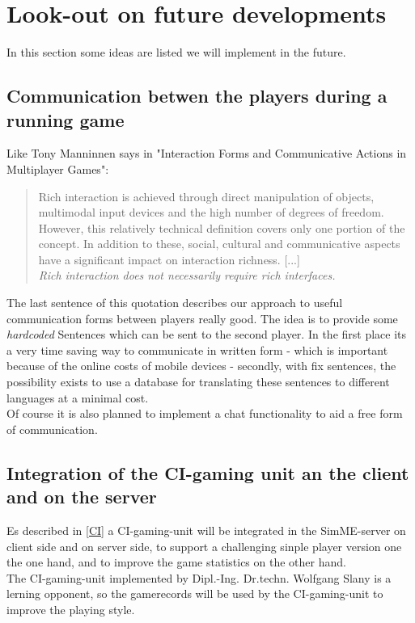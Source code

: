 \section{Look-out on future developments}
In this section some ideas are listed we will implement in the future.

\subsection{Communication betwen the players during a running game}
Like Tony Manninnen says in "Interaction Forms and Communicative Actions in
Multiplayer Games"\cite{mann03}:
\begin{quotation}
Rich interaction is achieved through direct manipulation of
objects, multimodal input devices and the high number of degrees of freedom.
However, this
relatively technical definition covers only one portion of the concept. In
addition to these, social, cultural and communicative aspects have a significant
impact on interaction richness. [...]\\
\textit{Rich interaction does not necessarily require rich interfaces.}
\end{quotation}
The last sentence of this quotation describes our approach to useful
communication forms between players really good. The idea is to provide some
\textit{hardcoded} Sentences which can be sent to the second player. In the
first place its a very time saving way to communicate in written form - which
is important because of the online costs of mobile devices - secondly, with fix
sentences, the possibility exists to use a database for translating these
sentences to different languages at a minimal cost.\\
Of course it is also planned to implement a chat functionality to aid a free
form of communication.

\subsection{Integration of the CI-gaming unit an the client and on the server}
Es described in \ref{CI} a CI-gaming-unit will be integrated in the
SimME-server on client side and on server side, to support a challenging sinple
player version one the one hand, and to improve the game statistics on the
other hand.\\
The CI-gaming-unit implemented by Dipl.-Ing. Dr.techn. Wolfgang Slany is a
lerning opponent, so the gamerecords will be used by the CI-gaming-unit to
improve the playing style.

